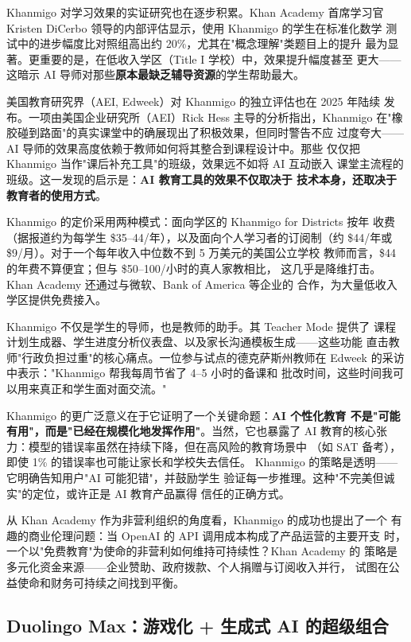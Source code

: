 Khanmigo 对学习效果的实证研究也在逐步积累。Khan Academy 首席学习官
Kristen DiCerbo 领导的内部评估显示，使用 Khanmigo 的学生在标准化数学
测试中的进步幅度比对照组高出约 20\%，尤其在"概念理解"类题目上的提升
最为显著。更重要的是，在低收入学区（Title I 学校）中，效果提升幅度甚至
更大——这暗示 AI 导师对那些\textbf{原本最缺乏辅导资源}的学生帮助最大。

美国教育研究界（AEI, Edweek）对 Khanmigo 的独立评估也在 2025 年陆续
发布。一项由美国企业研究所（AEI）Rick Hess 主导的分析指出，Khanmigo
在"橡胶碰到路面"的真实课堂中的确展现出了积极效果，但同时警告不应
过度夸大——AI 导师的效果高度依赖于教师如何将其整合到课程设计中。那些
仅仅把 Khanmigo 当作"课后补充工具"的班级，效果远不如将 AI 互动嵌入
课堂主流程的班级。这一发现的启示是：\textbf{AI 教育工具的效果不仅取决于
技术本身，还取决于教育者的使用方式}。

Khanmigo 的定价采用两种模式：面向学区的 Khanmigo for Districts 按年
收费（据报道约为每学生 \$35--44/年），以及面向个人学习者的订阅制（约
\$44/年或 \$9/月）。对于一个每年收入中位数不到 5 万美元的美国公立学校
教师而言，\$44 的年费不算便宜；但与 \$50--100/小时的真人家教相比，
这几乎是降维打击。Khan Academy 还通过与微软、Bank of America 等企业的
合作，为大量低收入学区提供免费接入。

Khanmigo 不仅是学生的导师，也是教师的助手。其 Teacher Mode 提供了
课程计划生成器、学生进度分析仪表盘、以及家长沟通模板生成——这些功能
直击教师"行政负担过重"的核心痛点。一位参与试点的德克萨斯州教师在
Edweek 的采访中表示："Khanmigo 帮我每周节省了 4--5 小时的备课和
批改时间，这些时间我可以用来真正和学生面对面交流。"

Khanmigo 的更广泛意义在于它证明了一个关键命题：\textbf{AI 个性化教育
不是"可能有用"，而是"已经在规模化地发挥作用"}。当然，它也暴露了
AI 教育的核心张力：模型的错误率虽然在持续下降，但在高风险的教育场景中
（如 SAT 备考），即使 1\% 的错误率也可能让家长和学校失去信任。
Khanmigo 的策略是透明——它明确告知用户"AI 可能犯错"，并鼓励学生
验证每一步推理。这种"不完美但诚实"的定位，或许正是 AI 教育产品赢得
信任的正确方式。

从 Khan Academy 作为非营利组织的角度看，Khanmigo 的成功也提出了一个
有趣的商业伦理问题：当 OpenAI 的 API 调用成本构成了产品运营的主要开支
时，一个以"免费教育"为使命的非营利如何维持可持续性？Khan Academy 的
策略是多元化资金来源——企业赞助、政府拨款、个人捐赠与订阅收入并行，
试图在公益使命和财务可持续之间找到平衡。


\subsection{Duolingo Max：游戏化 + 生成式 AI 的超级组合}
\label{subsec:duolingo-max}

